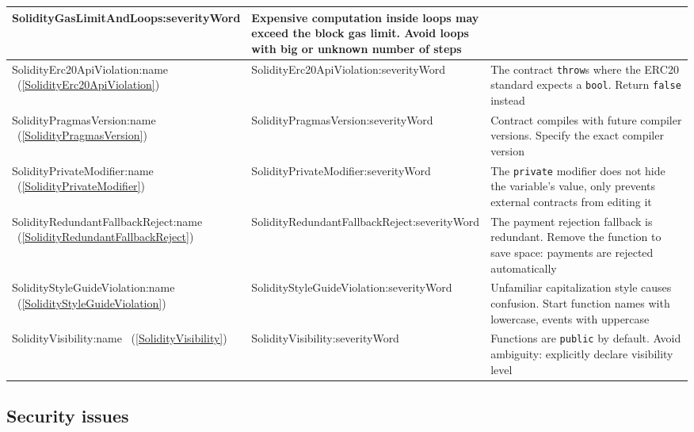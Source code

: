 \begin{table}[]
\begin{tabular}{|p{0.25\linewidth}|p{0.1\linewidth}|p{0.65\linewidth}|}
		\usevalue SolidityGasLimitAndLoops:severityWord 
		&
		Expensive computation inside loops may exceed the block gas limit.
		Avoid loops with big or unknown number of steps
		\\
		\hline
		\rowcolor{lightlightgray}
		\usevalue SolidityErc20ApiViolation:name ~(\ref{SolidityErc20ApiViolation})
		&
		\usevalue SolidityErc20ApiViolation:severityWord 
		&
		The contract \texttt{throw}s where the ERC20 standard expects a \texttt{bool}.
		Return \texttt{false} instead
		\\
		\hline
		\usevalue SolidityPragmasVersion:name ~(\ref{SolidityPragmasVersion})
		&
		\usevalue SolidityPragmasVersion:severityWord 
		&
		Contract compiles with future compiler versions.
		Specify the exact compiler version
		\\
		\hline
		\rowcolor{lightlightgray}
		\usevalue SolidityPrivateModifier:name ~(\ref{SolidityPrivateModifier})
		&
		\usevalue SolidityPrivateModifier:severityWord 
		&
		The \texttt{private} modifier does not hide the variable's value, only prevents external contracts from editing it
		\\
		\hline
		\usevalue SolidityRedundantFallbackReject:name ~(\ref{SolidityRedundantFallbackReject})
		&
		\usevalue SolidityRedundantFallbackReject:severityWord 
		&
		The payment rejection fallback is redundant.
		Remove the function to save space: payments are rejected automatically
		\\
		\hline
		\usevalue SolidityStyleGuideViolation:name ~(\ref{SolidityStyleGuideViolation})
		&
		\usevalue SolidityStyleGuideViolation:severityWord 
		&
		Unfamiliar capitalization style causes confusion.
		Start function names with lowercase, events with uppercase
		\\
		\hline
		\usevalue SolidityVisibility:name ~(\ref{SolidityVisibility})
		&
		\usevalue SolidityVisibility:severityWord 
		&
		Functions are \texttt{public} by default.
		Avoid ambiguity: explicitly declare visibility level
		\\
		\hline
	\end{tabular}
	\label{AllPatternsTable}
\end{table}


\subsection{Security issues} \label{sec:SecurityIssues}


